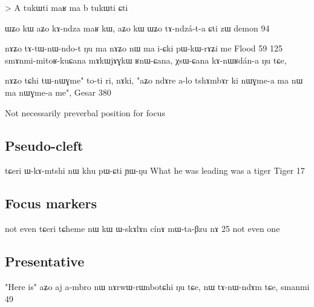 \documentclass[oldfontcommands,oneside,a4paper,11pt]{memoir}
\begin{document}
> A tukɯti maʁ ma b tukɯti ɕti



ɯʑo	kɯ	aʑo	kɤ-ndza	maʁ	kɯ, aʑo	kɯ	ɯʑo	tɤ-ndzá-t-a	ɕti	zɯ
demon 94

nɤʑo	tɤ-tɯ-nɯ-ndo-t	ŋu	ma	nɤʑo	nɯ	ma	i-ɕki	pɯ-kɯ-rɤʑi	me
Flood 59
125	smɤnmi-mitoʁ-kuɕana	mɤkɯjɤɣkɯ	ʁnɯ-ɕana,	χsɯ-ɕana	kɤ-nɯʁdán-a	ŋu	tɕe,

nɤʑo	tɕhi	tɯ-nɯɣme"	to-ti	ri,
	nɤki,	"aʑo	ndɤre	a-lo	tshɤmbɤr	ki	nɯɣme-a	ma	nɯ	ma	nɯɣme-a	me",
Gesar 380





Not necessarily preverbal position for focus

\subsection{Pseudo-cleft}

tɕeri ɯ-kɤ-mtshi nɯ khu pɯ-ɕti ɲɯ-ŋu 
What he was leading was a tiger
Tiger 17

\subsection{Focus markers}
not even
tɕeri	tɕheme	nɯ	kɯ	ɯ-skɤlɤn	cínɤ	mɯ-ta-βzu	nɤ
25
not even one



\subsection{Presentative}
"Here is"
aʑo	aj	a-mbro	nɯ	nɤrwɯ-rɯnbotɕhi	ŋu	tɕe,	nɯ	tɤ-nɯ-ndɤm	tɕe,
smanmi 49
\end{document}
